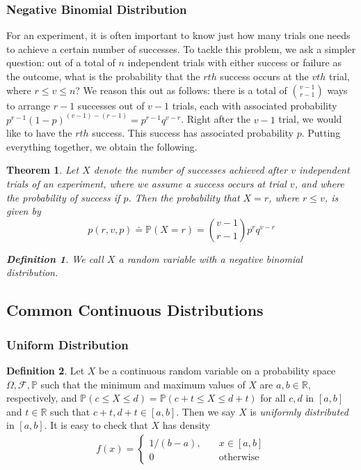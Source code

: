 \documentclass[12pt]{article}
\newcommand{\rr}{\mathbb{R}}
\newcommand{\filter}{\mathcal{F}}
\newcommand{\prob}{\mathbb{P}}
\theoremstyle{plain}
\newtheorem{theorem}{Theorem}
\theoremstyle{definition}
\newtheorem*{definition}{Definition}
\theoremstyle{remark}
\numberwithin{equation}{section}  %
\begin{document}
\subsubsection{Negative Binomial Distribution}
For an experiment, it is often important to know just how many trials
one needs to achieve a certain number of successes. To tackle this problem,
we ask a simpler question: out of a total of $n$ independent trials with
either success or failure as the outcome, what is the probability
that the $rth$ success occurs at the $vth$ trial, where $r \le v \le n$?
We reason this out as follows: there is a total of $\binom{v-1}{r-1}$ ways to
arrange $r-1$ successes out of $v-1$ trials, each with associated probability
$p^{r-1}(1 - p)^{(v-1) - (r-1)} = p^{r-1}q^{v-r}$. Right after the $v-1$ trial, we would like to
have the $rth$ success. This success has associated probability $p$. Putting
everything together, we obtain the following.
\begin{theorem}
Let $X$ denote the number of successes achieved after $v$ independent trials of an experiment,
where we assume a success occurs at trial $v$, and where the probability
of success if $p$. Then the probability that $X=r$, where $r \le v$, is given by
\begin{equation*}
p(r, v, p) \doteq \mathbb{P}(X = r) = \binom{v-1}{r-1} p^{r} q^{v-r}
\end{equation*}
\begin{definition}
We call $X$ a random variable with a \emph{negative binomial distribution}.
\end{definition}
\end{theorem}
\subsection{Common Continuous Distributions}
\subsubsection{Uniform Distribution}
\begin{definition}
Let $X$ be a continuous random variable on a probability space $\Omega, \filter,
\prob$ such that the minimum and maximum values of $X$ are $a,b \in \rr$,
respectively, and $\prob(c \le X \le d ) = \prob(c + t \le X \le d + t)$
for all $c, d$ in $[a,b]$  and $t \in \rr$ such that $c+t, d+t \in [a,b]$.
Then we say $X$ is \emph{uniformly distributed} in $[a,b]$. It is easy to check
that $X$ has density  
\begin{align*}
f(x) = \begin{cases}
1/(b-a), \quad & x \in [a,b] \\
0 \quad &\text{otherwise}
\end{cases}
\end{align*}
\end{definition}
\end{document}
